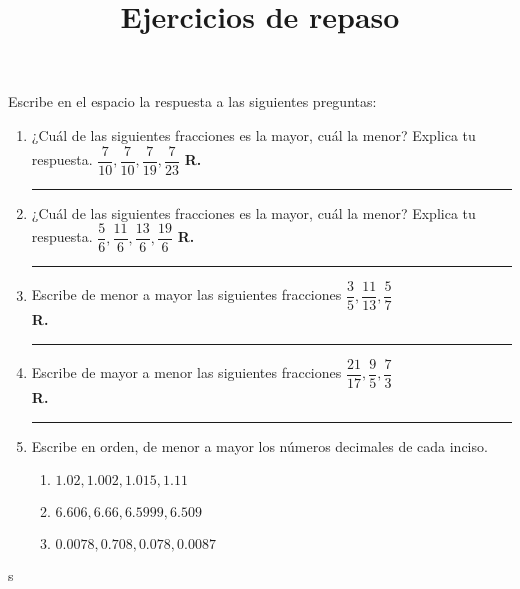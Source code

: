 

\title{Ejercicios de repaso \vspace{-2cm}}
\author{}
\date{ }

\renewcommand\thechoice{\Alph{choice})}
\newcommand\choicelabel{\thechoice}

\newenvironment{choices}%
  {\list{\choicelabel}%
     {\usecounter{choice}\def\makelabel##1{\hss\llap{##1}}%
       \settowidth{\leftmargin}{W.\hskip\labelsep\hskip 2.5em}%
       \def\choice{%
         \item
       } %
       \labelwidth\leftmargin\advance\labelwidth-\labelsep
       \topsep=0pt
       \partopsep=0pt
     }%
  }%
  {\endlist}

\newenvironment{oneparchoices}%
  {%
    \setcounter{choice}{0}%
    \def\choice{%
      \refstepcounter{choice}%
      \ifnum\value{choice}>1\relax
        \penalty -50\hskip 1em plus 1em\relax
      \fi
      \choicelabel
      \nobreak\enskip
    }%
    \ifvmode\else\enskip\fi
    \ignorespaces
  }%
  {}


\maketitle
\fontsize{14}{14}\selectfont

Escribe en el espacio la respuesta a las siguientes preguntas:
\begin{enumerate}[label=\alph*)]
\item ¿Cuál de las siguientes fracciones es la mayor, cuál la menor? Explica tu respuesta.  $\dfrac{7}{10}, \dfrac{7}{10}, \dfrac{7}{19}, \dfrac{7}{23}$ \hspace{0.3cm} \textbf{R.} \rule{3cm}{0.1mm}
\item ¿Cuál de las siguientes fracciones es la mayor, cuál la menor? Explica tu respuesta.  $\dfrac{5}{6}, \dfrac{11}{6}, \dfrac{13}{6}, \dfrac{19}{6}$ \hspace{0.3cm} \textbf{R.} \rule{3cm}{0.1mm}
\item Escribe de menor a mayor las siguientes fracciones $\dfrac{3}{5}, \dfrac{11}{13},\dfrac{5}{7}$ 
\\[0.3em]
\textbf{R.} \rule{3cm}{0.1mm}
\item Escribe de mayor a menor las siguientes fracciones $\dfrac{21}{17}, \dfrac{9}{5},\dfrac{7}{3}$ 
\\
\textbf{R.} \rule{3cm}{0.1mm}
\item Escribe en orden, de menor a mayor los números decimales de cada inciso.
\begin{enumerate}[label=\roman*)]
\item $1.02, 1.002, 1.015, 1.11$
\item $6.606, 6.66, 6.5999, 6.509$
\item $0.0078, 0.708, 0.078, 0.0087$
\end{enumerate}
\end{enumerate}s

